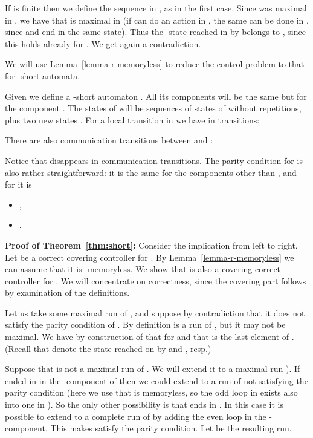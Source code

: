 \documentclass[10pt,a4paper]{article}
\begin{document}
If  is finite then we define the sequence  in , as in the first case. Since  was maximal in ,
we have that  is maximal in  (if  can do an action in
, the same can be done in , since  and  end in the same
state). Thus the -state reached in  by   belongs to ,
since this holds already for . We get again a contradiction.
\medskip

We will use Lemma~\ref{lemma-r-memoryless} to reduce the control
problem to that for -short automata.

Given  we define a -short automaton . All its
components will be the same but for the component . The states  of
 will be sequences  of states of  without
repetitions, plus two new states . For a local transition
 in  we have in  
transitions:

There are also
communication transitions between  and :

Notice that  disappears in communication transitions. 
The  parity condition for  is also rather straightforward: it
is the same for the components other than , and for  it is
\begin{itemize}
\item ,
\item  .
\end{itemize}



\medskip

\textbf{Proof of Theorem~\ref{thm:short}:}
  Consider the implication from left to right.
  Let  be a correct covering controller for . 
  By Lemma~\ref{lemma-r-memoryless} we can assume that it is -memoryless. 
  We show that  is also a covering correct controller for
  . We will concentrate on correctness, since the covering part
  follows by examination of the definitions. 

  Let us take some maximal run  of , and suppose by contradiction that it does not satisfy the
  parity condition of .  By definition  is a run
  of , but it may not be maximal. We have by
  construction of  that  for
   and that  is the last element of
  . (Recall that 
  denote the state reached on  by 
   and , resp.)

  Suppose that  is not a maximal run of . We will
  extend it to a maximal run ). If  ended in  in the
  -component of  then we could extend  to a run of
   not satisfying the parity condition (here we use that
   is memoryless, so the odd loop in  exists also into one in ). So the only
  other possibility is that  ends in .  In this case it is
  possible to extend  to a complete run of  by adding
  the even loop in the -component. This makes 
  satisfy the parity condition. Let  be the resulting run.
\end{document}
